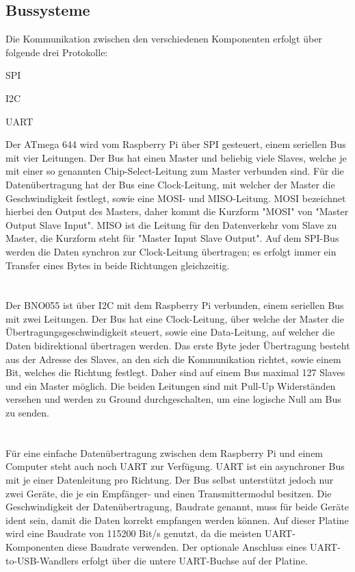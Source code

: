 \documentclass[12pt]{article}
\begin{document}
\subsection{Bussysteme}
Die Kommunikation zwischen den verschiedenen Komponenten erfolgt über folgende drei Protokolle:
\begin{compactitem}
    \item SPI
    \item I2C
    \item UART
\end{compactitem}\vspace{5mm}
Der ATmega 644 wird vom Raspberry Pi über SPI gesteuert, einem seriellen Bus mit vier Leitungen. Der Bus hat einen Master und beliebig viele Slaves, welche je mit einer so genannten Chip-Select-Leitung zum Master verbunden sind. Für die Datenübertragung hat der Bus eine Clock-Leitung, mit welcher der Master die Geschwindigkeit festlegt, sowie eine MOSI- und MISO-Leitung. MOSI bezeichnet hierbei den Output des Masters, daher kommt die Kurzform "MOSI" von "Master Output Slave Input". MISO ist die Leitung für den Datenverkehr vom Slave zu Master, die Kurzform steht für "Master Input Slave Output". Auf dem SPI-Bus werden die Daten synchron zur Clock-Leitung übertragen; es erfolgt immer ein Transfer eines Bytes in beide Richtungen gleichzeitig.
\\\\\\Der BNO055 ist über I2C mit dem Raspberry Pi verbunden, einem seriellen Bus mit zwei Leitungen. Der Bus hat eine Clock-Leitung, über welche der Master die Übertragungsgeschwindigkeit steuert, sowie eine Data-Leitung, auf welcher die Daten bidirektional übertragen werden. Das erste Byte jeder Übertragung besteht aus der Adresse des Slaves, an den sich die Kommunikation richtet, sowie einem Bit, welches die Richtung festlegt. Daher sind auf einem Bus maximal 127 Slaves und ein Master möglich. Die beiden Leitungen sind mit Pull-Up Widerständen versehen und werden zu Ground durchgeschalten, um eine logische Null am Bus zu senden.
\\\\\\Für eine einfache Datenübertragung zwischen dem Raspberry Pi und einem Computer steht auch noch UART zur Verfügung. UART ist ein asynchroner Bus mit je einer Datenleitung pro Richtung. Der Bus selbst unterstützt jedoch nur zwei Geräte, die je ein Empfänger- und einen Transmittermodul besitzen. Die Geschwindigkeit der Datenübertragung, Baudrate genannt, muss für beide Geräte ident sein, damit die Daten korrekt empfangen werden können. Auf dieser Platine wird eine Baudrate von 115200 Bit/s genutzt, da die meisten UART-Komponenten diese Baudrate verwenden. Der optionale Anschluss eines UART-to-USB-Wandlers erfolgt über die untere UART-Buchse auf der Platine.
\end{document}
